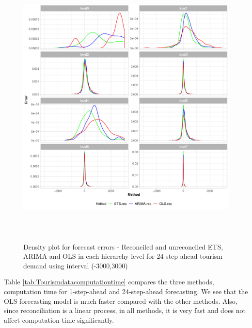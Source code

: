\documentclass[11pt,a4paper,]{article}
\begin{document}
\begin{figure}

{\centering \includegraphics[width=450px,height=550px]{Paper-Figures/results_Tourism/densityplot_24} 

}

\caption{Density plot for forecast errors - Reconciled and unreconciled ETS, ARIMA and OLS in each hierarchy level for 24-step-ahead tourism demand using interval (-3000,3000)}\label{fig:densityplottourism}
\end{figure}

Table \ref{tab:Tourismdatacomputationtime} compares the three methods, computation time for 1-step-ahead and 24-step-ahead forecasting. We see that the OLS forecasting model is much faster compared with the other methods. Also, since reconciliation is a linear process, in all methods, it is very fast and does not affect computation time significantly.
\end{document}
